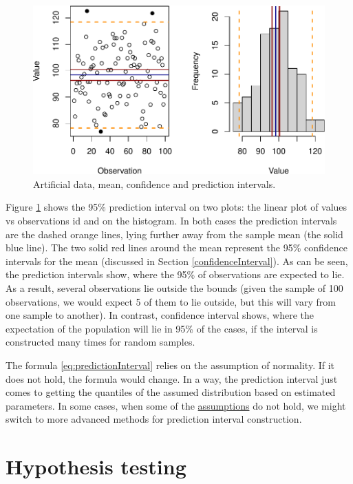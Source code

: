 \documentclass[
]{book}
\theoremstyle{definition}
\theoremstyle{definition}
\theoremstyle{definition}
\theoremstyle{definition}
\theoremstyle{remark}
\begin{document}
\begin{figure}
\centering
\includegraphics{Svetunkov---Statistics-for-Business-Analytics_files/figure-latex/predictionInterval-1.pdf}
\caption{\label{fig:predictionInterval}Artificial data, mean, confidence and prediction intervals.}
\end{figure}

Figure \ref{fig:predictionInterval} shows the 95\% prediction interval on two plots: the linear plot of values vs observations id and on the histogram. In both cases the prediction intervals are the dashed orange lines, lying further away from the sample mean (the solid blue line). The two solid red lines around the mean represent the 95\% confidence intervals for the mean (discussed in Section \ref{confidenceInterval}). As can be seen, the prediction intervals show, where the 95\% of observations are expected to lie. As a result, several observations lie outside the bounds (given the sample of 100 observations, we would expect 5 of them to lie outside, but this will vary from one sample to another). In contrast, confidence interval shows, where the expectation of the population will lie in 95\% of the cases, if the interval is constructed many times for random samples.

The formula \eqref{eq:predictionInterval} relies on the assumption of normality. If it does not hold, the formula would change. In a way, the prediction interval just comes to getting the quantiles of the assumed distribution based on estimated parameters. In some cases, when some of the \hyperref[assumptions]{assumptions} do not hold, we might switch to more advanced methods for prediction interval construction.

\chapter{Hypothesis testing}\label{hypothesisTesting}
\end{document}
